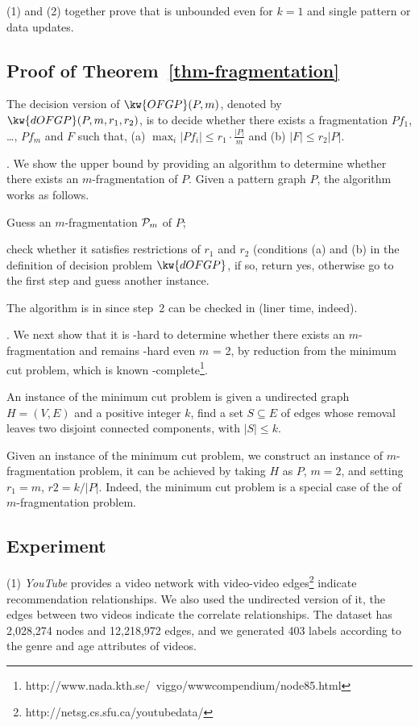 (1) and (2) together prove that \dyngr is unbounded even for $k=1$ and single pattern or data updates.


\subsection{Proof of Theorem~\ref{thm-fragmentation}}

The decision version of $\kw{OFGP}(P, m)$, denoted by $\kw{dOFGP}(P, m, r_1, r_2)$, is to decide whether there exists a fragmentation ${Pf}_1$, \ldots, ${Pf}_m$ and $F$ such that, (a) $\max_i |{Pf}_i| \leq r_1\cdot\frac{|P|}{m}$ and (b) $|F|\leq r_2|P|$.

.
We show the \NP upper bound by providing an \NP algorithm to determine whether there exists an $m$-fragmentation of $P$. Given a pattern graph $P$, the algorithm works as follows.
\bi
\item Guess an $m$-fragmentation ${\cal P}_m$ of $P$;
\item check whether it satisfies restrictions of $r_1$ and $r_2$ (conditions (a) and (b) in the definition of decision problem $\kw{dOFGP}$, if so, return yes, otherwise go to the first step and guess another instance.
\ei

The algorithm is in \NP since step~2 can be checked in \PTIME (liner time, indeed).

.
We next show that it is \NP-hard to determine whether there exists an $m$-fragmentation and remains \NP-hard even $m$ = 2, by reduction from the minimum cut problem, which is known \NP-complete\footnote{\small http://www.nada.kth.se/~viggo/wwwcompendium/node85.html}.

An instance of the minimum cut problem is given a undirected graph $H=(V,E)$ and a positive integer $k$, find a set $S \subseteq E$ of edges whose removal leaves two disjoint connected components, with $|S|\leq k$.

Given an instance of the minimum cut problem, we construct an instance of $m$-fragmentation problem, it can be achieved by taking $H$ as $P$, $m=2$, and setting $r_1=m$, $r2 = k/|P|$. Indeed, the minimum cut problem is a special case of the of $m$-fragmentation problem.



\subsection{Experiment}

\ni(1) {\em YouTube} provides a video network with video-video edges\footnote{\small http://netsg.cs.sfu.ca/youtubedata/} indicate recommendation relationships. We also used the undirected version of it, the edges between two videos indicate the correlate relationships. The dataset has 2,028,274 nodes and 12,218,972 edges, and we generated 403 labels according to the genre and age attributes of videos.

